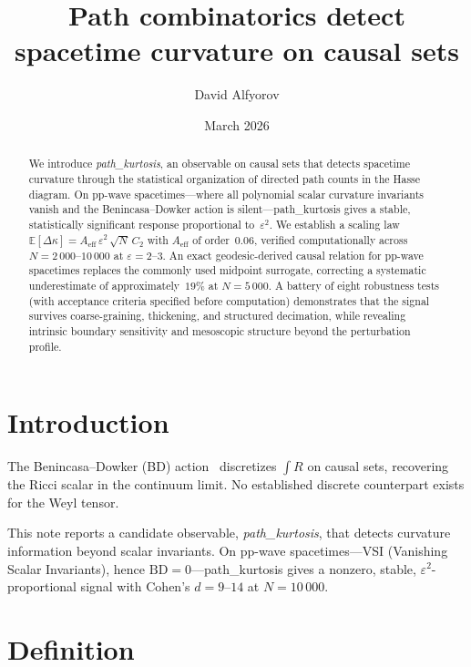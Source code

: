 \documentclass[11pt,a4paper]{article}
\title{Path combinatorics detect spacetime curvature on causal sets}
\author{David Alfyorov}
\date{March 2026}
\begin{document}
\maketitle

\begin{abstract}
We introduce \textit{path\_kurtosis}, an observable on causal sets that detects spacetime
curvature through the statistical organization of directed path counts in the Hasse
diagram.  On pp-wave spacetimes---where all polynomial scalar curvature invariants
vanish and the Benincasa--Dowker action is silent---path\_kurtosis gives a stable,
statistically significant response proportional to~$\varepsilon^{2}$.  We establish a
scaling law $\mathbb{E}[\Delta\kappa] = A_{\mathrm{eff}}\,\varepsilon^{2}\,\sqrt{N}\,C_{2}$
with $A_{\mathrm{eff}}$ of order~$0.06$, verified computationally across
$N = 2\,000$--$10\,000$ at $\varepsilon = 2$--$3$.  An exact geodesic-derived causal
relation for pp-wave spacetimes replaces the commonly used midpoint surrogate,
correcting a systematic underestimate of approximately~$19\%$ at $N = 5\,000$.  A
battery of eight robustness tests (with acceptance criteria specified before computation)
demonstrates that the signal survives coarse-graining, thickening, and structured
decimation, while revealing intrinsic boundary sensitivity and mesoscopic structure
beyond the perturbation profile.
\end{abstract}

\tableofcontents

\section{Introduction}
\label{sec:introduction}

The Benincasa--Dowker (BD) action~\cite{BD2013} discretizes $\int R$ on causal sets,
recovering the Ricci scalar in the continuum limit.  No established discrete counterpart
exists for the Weyl tensor.

This note reports a candidate observable, \textit{path\_kurtosis}, that detects curvature
information beyond scalar invariants.  On pp-wave spacetimes---VSI (Vanishing Scalar
Invariants), hence $\mathrm{BD} = 0$---path\_kurtosis gives a nonzero, stable,
$\varepsilon^{2}$-proportional signal with Cohen's $d = 9$--$14$ at $N = 10\,000$.

\section{Definition}
\label{sec:definition}
\end{document}
